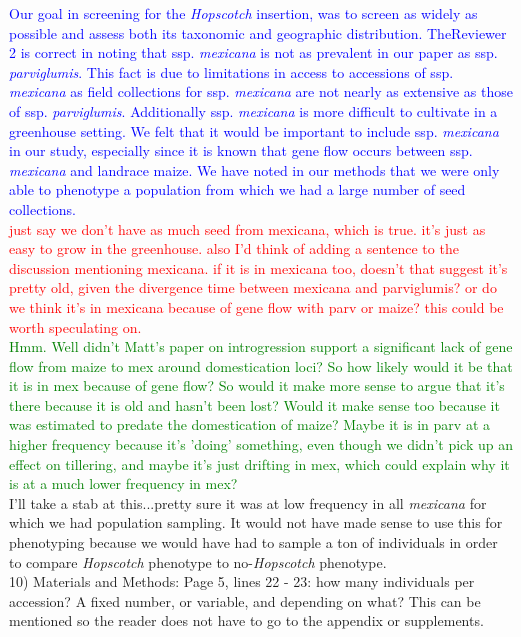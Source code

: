 \documentclass[11pt]{article}
\newcommand{\res}[1]{\noindent \textcolor{blue}{{#1}} \\}
\newcommand{\jri}[1]{\noindent \textcolor{red}{{#1}} \\}
\newcommand{\lev}[1]{\noindent \textcolor{green}{{#1}} \\}
\newcommand{\mbh}[1]{\noindent \textcolor{Dandelion}{{#1}}\\}
\begin{document}
\res{Our goal in screening for the \emph{Hopscotch} insertion, was to screen as widely as possible and assess both its taxonomic and geographic distribution.  TheReviewer 2 is correct in noting that ssp. \emph{mexicana} is not as prevalent in our paper as ssp. \emph{parviglumis}. This fact is due to limitations in access to accessions of ssp. \emph{mexicana} as field collections for ssp. \emph{mexicana} are not nearly as extensive as those of ssp. \emph{parviglumis}. Additionally ssp. \emph{mexicana} is more difficult to cultivate in a greenhouse setting. We felt that it would be important to include ssp. \emph{mexicana} in our study, especially since it is known that gene flow occurs between ssp. \emph{mexicana} and landrace maize. We have noted in our methods that we were only able to phenotype a population from which we had a large number of seed collections.} \jri{just say we don't have as much seed from mexicana, which is true. it's just as easy to grow in the greenhouse. also I'd think of adding a sentence to the discussion mentioning mexicana. if it is in mexicana too, doesn't that suggest it's pretty old, given the divergence time between mexicana and parviglumis? or do we think it's in mexicana because of gene flow with parv or maize? this could be worth speculating on.}
\lev{Hmm. Well didn't Matt's paper on introgression support a significant lack of gene flow from maize to mex around domestication loci? So how likely would it be that it is in mex because of gene flow? So would it make more sense to argue that it's there because it is old and hasn't been lost? Would it make sense too because it was estimated to predate the domestication of maize? Maybe it is in parv at a higher frequency because it's 'doing' something, even though we didn't pick up an effect on tillering, and maybe it's just drifting in mex, which could explain why it is at a much lower frequency in mex?}

\mbh{I'll take a stab at this...pretty sure it was at low frequency in all \emph{mexicana} for which we had population sampling.  It would not have made sense to use this for phenotyping because we would have had to sample a ton of individuals in order to compare \emph{Hopscotch} phenotype to no-\emph{Hopscotch} phenotype.}

10) Materials and Methods:
Page 5, lines 22 - 23: how many individuals per accession? A fixed number, or variable, and depending on what? This can be mentioned so the reader does not have to go to the appendix or supplements.\\ 
\end{document}
